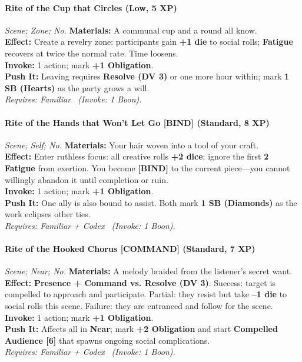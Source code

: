 \paragraph*{Rite of the Cup that Circles (Low, 5 XP)} \emph{Scene; Zone; No.}
\textbf{Materials:} A communal cup and a round all know.\\
\textbf{Effect:} Create a revelry zone: participants gain \textbf{+1 die} to social rolls; \textbf{Fatigue} recovers at twice the normal rate. Time loosens.\\
\textbf{Invoke:} 1 action; mark \textbf{+1 Obligation}.\\
\textbf{Push It:} Leaving requires \textbf{Resolve (DV 3)} or one more hour within; mark \textbf{1 SB (Hearts)} as the party grows a will.\\
\emph{Requires: Familiar \ (\textit{Invoke:} 1 Boon).}

\paragraph{Rite of the Hands that Won't Let Go \textnormal{[BIND]} (Standard, 8 XP)} \emph{Scene; Self; No.}
\textbf{Materials:} Your hair woven into a tool of your craft.\\
\textbf{Effect:} Enter ruthless focus: all creative rolls \textbf{+2 dice}; ignore the first \textbf{2 Fatigue} from exertion. You become \textbf{[BIND]} to the current piece—you cannot willingly abandon it until completion or ruin.\\
\textbf{Invoke:} 1 action; mark \textbf{+1 Obligation}.\\
\textbf{Push It:} One ally is also bound to assist. Both mark \textbf{1 SB (Diamonds)} as the work eclipses other ties.\\
\emph{Requires: Familiar + Codex \ (\textit{Invoke:} 1 Boon).}

\paragraph{Rite of the Hooked Chorus \textnormal{[COMMAND]} (Standard, 7 XP)} \emph{Scene; Near; No.}
\textbf{Materials:} A melody braided from the listener's secret want.\\
\textbf{Effect:} \textbf{Presence + Command vs. Resolve (DV 3)}. Success: target is compelled to approach and participate. Partial: they resist but take \textbf{--1 die} to social rolls this scene. Failure: they are entranced and follow for the scene.\\
\textbf{Invoke:} 1 action; mark \textbf{+1 Obligation}.\\
\textbf{Push It:} Affects all in \textbf{Near}; mark \textbf{+2 Obligation} and start \textbf{Compelled Audience [6]} that spawns ongoing social complications.\\
\emph{Requires: Familiar + Codex \ (\textit{Invoke:} 1 Boon).}

